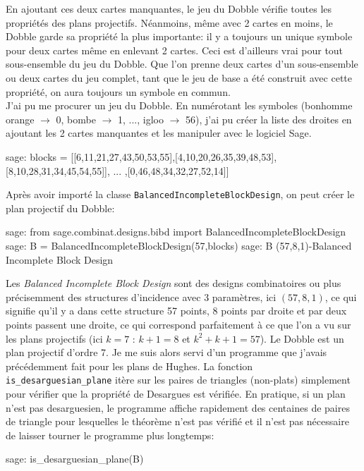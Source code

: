 \documentclass[a4paper]{article}
\begin{document}
En ajoutant ces deux cartes manquantes, le jeu du Dobble vérifie toutes les propriétés des plans projectifs. Néanmoins, même avec 2 cartes en moins, le Dobble garde sa propriété la plus importante: il y a toujours un unique symbole pour deux cartes même en enlevant 2 cartes. Ceci est d'ailleurs vrai pour tout sous-ensemble du jeu du Dobble. Que l'on prenne deux cartes d'un sous-ensemble ou deux cartes du jeu complet, tant que le jeu de base a été construit avec cette propriété, on aura toujours un symbole en commun.\vspace{1\baselineskip}\\
J'ai pu me procurer un jeu du Dobble. En numérotant les symboles (bonhomme orange $\rightarrow$ 0, bombe $\rightarrow$ 1, ..., igloo $\rightarrow$ 56), j'ai pu créer la liste des droites en ajoutant les 2 cartes manquantes et les manipuler avec le logiciel Sage.
\begin{sageverbatim}
 sage: blocks = [[6,11,21,27,43,50,53,55],[4,10,20,26,35,39,48,53],
        [8,10,28,31,34,45,54,55]], ... ,[0,46,48,34,32,27,52,14]]
\end{sageverbatim}
Après avoir importé la classe \texttt{BalancedIncompleteBlockDesign}, on peut créer le plan projectif du Dobble:
\begin{sageverbatim}
 sage: from sage.combinat.designs.bibd import BalancedIncompleteBlockDesign
 sage: B = BalancedIncompleteBlockDesign(57,blocks)
 sage: B
 (57,8,1)-Balanced Incomplete Block Design
\end{sageverbatim}
Les \textit{Balanced Incomplete Block Design} sont des designs combinatoires ou plus précisemment des structures d'incidence avec 3 paramètres, ici $(57, 8, 1)$, ce qui signifie qu'il y a dans cette structure 57 points, 8 points par droite et par deux points passent une droite, ce qui correspond parfaitement à ce que l'on a vu sur les plans projectifs (ici $k=7$ : $k+1=8$ et $k^2+k+1=57$).
Le Dobble est un plan projectif d'ordre 7.
\newpage
Je me suis alors servi d'un programme que j'avais précédemment fait pour les plans de Hughes. La fonction \texttt{is\_desarguesian\_plane} itère sur les paires de triangles (non-plats) simplement pour vérifier que la propriété de Desargues est vérifiée. En pratique, si un plan n'est pas desarguesien, le programme affiche rapidement des centaines de paires de triangle pour lesquelles le théorème n'est pas vérifié et il n'est pas nécessaire de laisser tourner le programme plus longtemps:
\begin{sageverbatim}
 sage: is_desarguesian_plane(B)
  
\end{sageverbatim}
\end{document}
